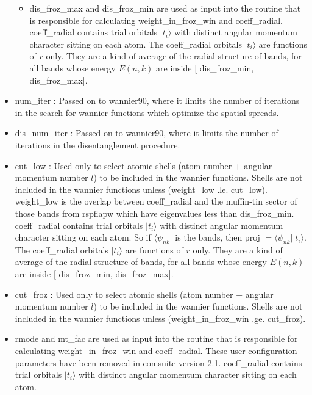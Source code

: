 \documentclass[aps,prb,singlecolumn,preprintnumbers,amsmath,amssymb]{revtex4}
\begin{document}
\begin{itemize}
\begin{itemize}
        \item dis\_froz\_max and dis\_froz\_min are used as input into the routine that is responsible for calculating weight\_in\_froz\_win and coeff\_radial.  %
        coeff\_radial contains trial orbitals $|t_i \rangle$ with distinct angular momentum character sitting on  each atom.  The coeff\_radial  orbitals $|t_i \rangle$ are functions of $r$ only.  They are a kind of average of the radial structure of bands, for all bands whose energy $E(n,k)$ are inside [ dis\_froz\_min,  dis\_froz\_max].
        \end{itemize}
      \item   num\_iter : Passed on to wannier90, where it limits the number of iterations in the search for wannier functions which optimize the spatial spreads. %
      \item   dis\_num\_iter : Passed on to wannier90, where it limits the number of iterations in the disentanglement procedure. %
\item cut\_low :  Used only to select  atomic shells (atom number + angular momentum number $l$)  to be included in the wannier functions.  Shells are not included in the wannier functions unless (weight\_low .le. cut\_low).  weight\_low  is  the  overlap between coeff\_radial and the muffin-tin sector of those bands from rspflapw which have eigenvalues less than dis\_froz\_min.   coeff\_radial contains trial orbitals $|t_i \rangle$ with distinct angular momentum character sitting on  each atom.    So if $\langle \psi_{nk} | $ is the bands, then proj    $ = \langle \psi_{nk} | |t_i \rangle$. The coeff\_radial  orbitals $|t_i \rangle$ are functions of $r$ only.  They are a kind of average of the radial structure of bands, for all bands whose energy $E(n,k)$ are inside [ dis\_froz\_min,  dis\_froz\_max].
\item cut\_froz : Used only to select atomic shells (atom number + angular momentum number $l$) to be included in the wannier functions.  Shells are not included in the wannier functions unless (weight\_in\_froz\_win .ge. cut\_froz).
 \item rmode and mt\_fac are used as input into the routine that is responsible for calculating weight\_in\_froz\_win and coeff\_radial.   These user configuration parameters have been removed in comsuite version 2.1. %
  coeff\_radial contains trial orbitals $|t_i \rangle$ with distinct angular momentum character sitting on  each atom. 

\end{itemize}
\end{document}
